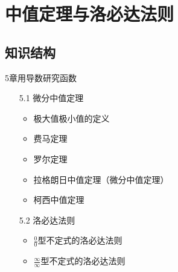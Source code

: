 \documentclass[12pt,UTF8]{ctexart}
\begin{document}
\setcounter{section}{6}
\section{中值定理与洛必达法则}
\noindent
\subsection{知识结构}
5章用导数研究函数
	\begin{enumerate}
		\item[5.1] 微分中值定理
			\begin{itemize}
				\item 极大值极小值的定义
				\item 费马定理
				\item 罗尔定理
				\item 拉格朗日中值定理（微分中值定理）
				\item 柯西中值定理
			\end{itemize}
		\item[5.2] 洛必达法则
			\begin{itemize}
				\item $\frac00$型不定式的洛必达法则
				\item $\frac\infty\infty$型不定式的洛必达法则
			\end{itemize}
	\end{enumerate}
\end{document}
